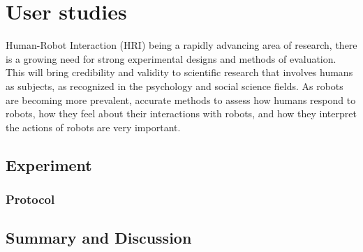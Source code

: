 
\chapter{User studies} %

\label{Chapter6} %

Human-Robot Interaction (HRI) being a rapidly advancing area of research, there is a growing need for strong experimental designs and methods of evaluation. This will bring credibility and validity to scientific research that involves humans as subjects, as recognized in the psychology and social science fields. As robots are becoming more prevalent, accurate methods to assess how humans respond to robots, how they feel about their interactions with robots, and how they interpret the actions of robots are very important. 

\section{Experiment}

\subsection{Protocol}

\section{Summary and Discussion}